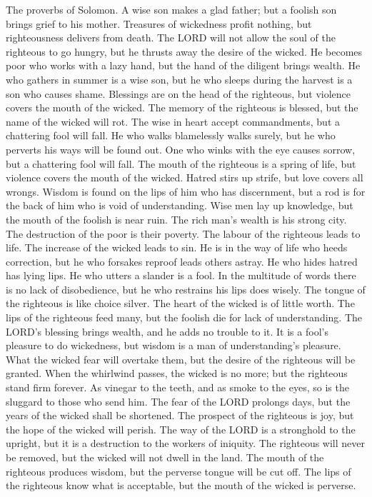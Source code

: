  The proverbs of Solomon. A wise son makes a glad father;
but a foolish son brings grief to his mother.  Treasures of
wickedness profit nothing, but righteousness delivers from death.
 The LORD will not allow the soul of the righteous to go
hungry, but he thrusts away the desire of the wicked.  He
becomes poor who works with a lazy hand, but the hand of the diligent
brings wealth.  He who gathers in summer is a wise son, but
he who sleeps during the harvest is a son who causes shame. 
Blessings are on the head of the righteous, but violence covers the
mouth of the wicked.  The memory of the righteous is
blessed, but the name of the wicked will rot.  The wise in
heart accept commandments, but a chattering fool will fall. 
He who walks blamelessly walks surely, but he who perverts his ways will
be found out.  One who winks with the eye causes sorrow,
but a chattering fool will fall.  The mouth of the
righteous is a spring of life, but violence covers the mouth of the
wicked.  Hatred stirs up strife, but love covers all
wrongs.  Wisdom is found on the lips of him who has
discernment, but a rod is for the back of him who is void of
understanding.  Wise men lay up knowledge, but the mouth of
the foolish is near ruin.  The rich man's wealth is his
strong city. The destruction of the poor is their poverty. 
The labour of the righteous leads to life. The increase of the wicked
leads to sin.  He is in the way of life who heeds
correction, but he who forsakes reproof leads others astray.
 He who hides hatred has lying lips. He who utters a
slander is a fool.  In the multitude of words there is no
lack of disobedience, but he who restrains his lips does wisely.
 The tongue of the righteous is like choice silver. The
heart of the wicked is of little worth.  The lips of the
righteous feed many, but the foolish die for lack of understanding.
 The LORD's blessing brings wealth, and he adds no trouble
to it.  It is a fool's pleasure to do wickedness, but
wisdom is a man of understanding's pleasure.  What the
wicked fear will overtake them, but the desire of the righteous will be
granted.  When the whirlwind passes, the wicked is no more;
but the righteous stand firm forever.  As vinegar to the
teeth, and as smoke to the eyes, so is the sluggard to those who send
him.  The fear of the LORD prolongs days, but the years of
the wicked shall be shortened.  The prospect of the
righteous is joy, but the hope of the wicked will perish. 
The way of the LORD is a stronghold to the upright, but it is a
destruction to the workers of iniquity.  The righteous will
never be removed, but the wicked will not dwell in the land.
 The mouth of the righteous produces wisdom, but the
perverse tongue will be cut off.  The lips of the righteous
know what is acceptable, but the mouth of the wicked is perverse.

